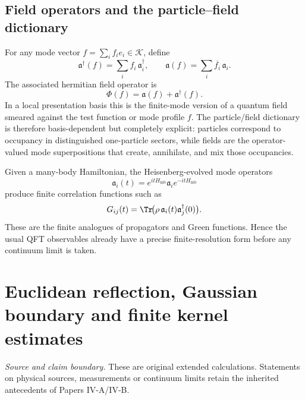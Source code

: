 \documentclass[12pt,a4paper]{article}
\begin{document}
\subsection[Field operators, correlation functions, and the particle/field dictionary]
{Field operators and the particle--field dictionary}
\label{p4:sec:part2-field-dictionary}

For any mode vector $f=\sum_i f_i e_i\in\mathcal K$, define
\begin{equation}
\label{p4:eq:mode-operators}
\mathfrak a^\dagger(f)
=
\sum_i f_i\,\mathfrak a_i^\dagger,
\qquad
\mathfrak a(f)
=
\sum_i \overline{f_i}\,\mathfrak a_i.
\end{equation}
The associated hermitian field operator is
\begin{equation}
\label{p4:eq:field-operator}
\Phi(f)=\mathfrak a(f)+\mathfrak a^\dagger(f).
\end{equation}
In a local presentation basis this is the finite-mode version of a quantum field smeared against the test function or mode profile $f$.
The particle/field dictionary is therefore basis-dependent but completely explicit: particles correspond to occupancy in distinguished one-particle sectors, while fields are the operator-valued mode superpositions that create, annihilate, and mix those occupancies.

Given a many-body Hamiltonian, the Heisenberg-evolved mode operators
\begin{equation}
\label{p4:eq:heis-mode}
\mathfrak a_i(t)=e^{itH_{\mathrm{mb}}}\mathfrak a_i e^{-itH_{\mathrm{mb}}}
\end{equation}
produce finite correlation functions such as
\begin{equation}
\label{p4:eq:two-point}
G_{ij}(t)
=
\Tr\!\bigl(\rho\,\mathfrak a_i(t)\mathfrak a_j^\dagger(0)\bigr).
\end{equation}
These are the finite analogues of propagators and Green functions.
Hence the usual QFT observables already have a precise finite-resolution form before any continuum limit is taken.



\section{Euclidean reflection, Gaussian boundary and finite kernel estimates}
\label{p4c:sec:v238-c3}
\noindent\textit{Source and claim boundary.} These are original extended calculations. Statements on physical sources, measurements or continuum limits retain the inherited antecedents of Papers IV-A/IV-B.
\end{document}
